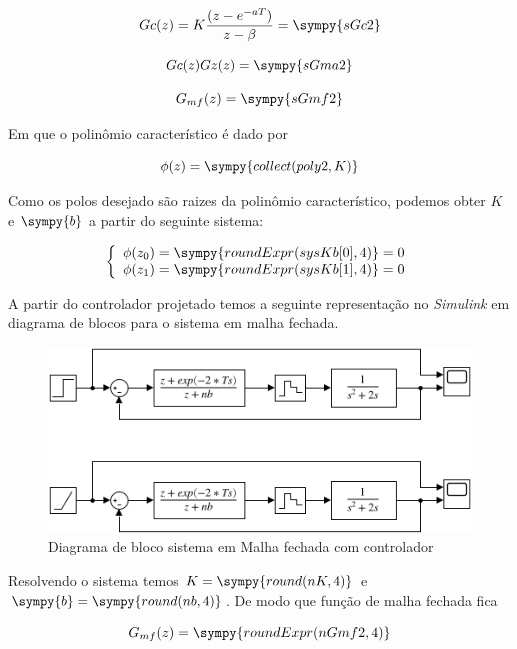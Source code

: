 \documentclass[a4paper,11pt]{article}
\newcommand{\npy}[1]{\sympy{round(#1,4)}}
\begin{document}
\begin{equation}
    Gc(z) = K\frac{(z-e^{-aT})}{z-\beta} = \sympy{sGc2}
\end{equation}

\begin{equation}
    Gc(z)Gz(z) = \sympy{sGma2}
\end{equation}

\begin{equation}
    G_{mf}(z) = \sympy{sGmf2}
\end{equation}

Em que o polinômio característico é dado por

\begin{equation}
    \phi(z) = \sympy{collect(poly2,K)}
\end{equation}

Como os polos desejado são raizes da polinômio característico, podemos obter $K$ e $\sympy{b}$ a partir do seguinte sistema:

$$
\left\{
\begin{array}{l}
    \phi(z_0) = \sympy{roundExpr(sysKb[0],4)} = 0\\
    \phi(z_1) = \sympy{roundExpr(sysKb[1],4)} = 0
\end{array}
\right.
$$

A partir do controlador projetado temos a seguinte representação no \textit{Simulink} em diagrama de blocos para o sistema em malha fechada.

\begin{figure}[H]
    \centering
    \includegraphics[width=0.8\linewidth]{img/exsim3modelPart2.png}
    \caption{Diagrama de bloco sistema em Malha fechada com controlador}
\end{figure}

Resolvendo o sistema temos $K = \npy{nK}$ e $\sympy{b} = \npy{nb}$. De modo que função de malha fechada fica

\begin{equation}
    G_{mf}(z) = \sympy{roundExpr(nGmf2,4)}
\end{equation}
\end{document}
